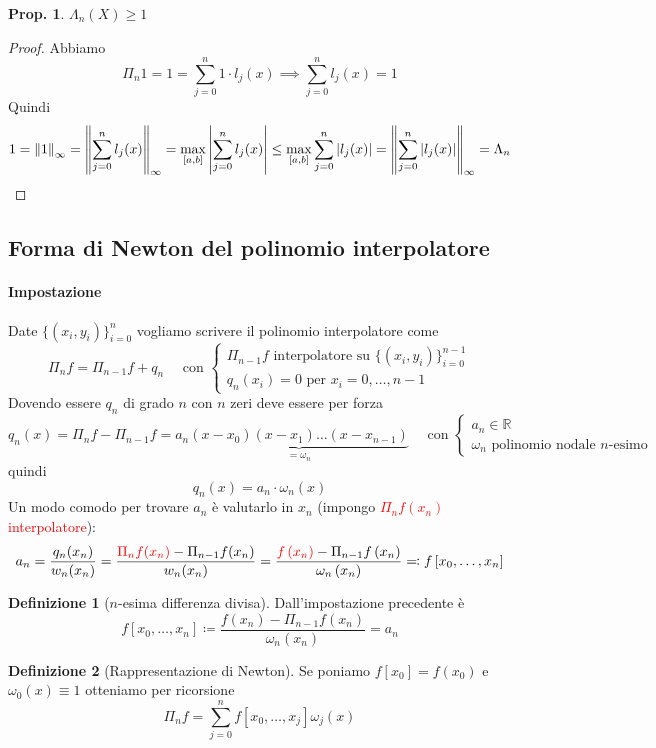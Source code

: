 \documentclass[a4paper,10pt]{article}
\theoremstyle{definition}
\newcommand{\re}{\mathbb{R}} %
\theoremstyle{indentdefinition}
\newtheorem{defn}{Definizione}[section]
\theoremstyle{indenttheorem}
\newtheorem{prop}{Prop.}
\theoremstyle{myremark}
\theoremstyle{indentgeneral}
\theoremstyle{plain}
\theoremstyle{plain}
\begin{document}
\begin{prop}
    $\Lambda_{n}\left(X\right)\ge 1$
\end{prop}

\begin{proof}
    Abbiamo
    $$\Pi_n1=1=\sum_{j=0}^n1\cdot l_j(x)\implies\sum_{j=0}^nl_j(x)=1$$
    Quindi
    $$1=\norm{1}_\infty=\norm{\sum_{j=0}^nl_j(x)}_\infty=\max_{[a,b]}\abs{\sum_{j=0}^nl_j(x)}\le \max_{[a,b]}\sum_{j=0}^n\abs{l_j(x)}=\norm{\sum_{j=0}^n\abs{l_j(x)}}_\infty=\Lambda_n$$
\end{proof}

\subsection{Forma di Newton del polinomio interpolatore}
\paragraph{Impostazione} Date $\{(x_i,y_i)\}_{i=0}^n$ vogliamo scrivere il polinomio interpolatore come
$$\Pi_{n}f=\Pi_{n-1}f+q_{n} \quad \text{ con }\begin{cases}
    \Pi_{n-1}f \text{ interpolatore su } \{(x_i,y_i)\}_{i=0}^{n-1}\\
    q_{n}\left(x_{i}\right)=0 \text{ per }
x_{i}=0,\dots,n-1
\end{cases}$$
Dovendo essere $q_n$ di grado $n$ con $n$ zeri deve essere per forza
$$q_n(x)=\Pi_{n}f-\Pi_{n-1}f=a_n\underbrace{(x-x_0)(x-x_1)\dots(x-x_{n-1})}_{=\omega_n}\quad \text{ con }\begin{cases}
    a_n\in\re\\
    \omega_n \text{ polinomio nodale $n$-esimo}
\end{cases}$$
quindi
$$\boxed{q_n(x)=a_{n}\cdot\omega_{n}\left(x\right) }$$
Un modo comodo per trovare $a_n$ è valutarlo in $x_n$ (impongo \textcolor{red}{$\Pi_{n}f(x_n)$ interpolatore}):
$$a_n=\frac{q_n(x_n)}{w_n(x_n)}=\frac{\textcolor{red}{\Pi_{n}f(x_n)}-\Pi_{n-1}f(x_n)}{w_n(x_n)}=\frac{\textcolor{red}{f\left(x_{n}\right)}-\Pi_{n-1}f\left(x_{n}\right)}{\omega_{n}\left(x_{n}\right)}\eqqcolon f\left[x_{0},\dots,x_{n}\right]$$

\begin{defn}[$n$-esima differenza divisa] Dall'impostazione precedente è
$$f\left[x_{0},\dots,x_{n}\right]\coloneqq\frac{f\left(x_{n}\right)-\Pi_{n-1}f\left(x_{n}\right)}{\omega_{n}\left(x_{n}\right)}=a_n $$
\end{defn}

\begin{defn}[Rappresentazione di Newton] Se poniamo $f[x_0]=f(x_0)$ e $\omega_0(x)\equiv 1$ otteniamo per ricorsione
\begin{equation}
{\Pi_{n}f=\sum_{j=0}^{n}f\left[x_{0},\dots,x_{j}\right]\omega_{j}\left(x\right)}\label{eq:interpolazione-newton}
\end{equation}
\end{defn}
\end{document}
